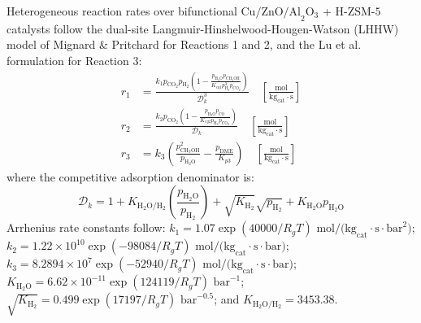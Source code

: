 \documentclass[12pt,a4paper]{article}
\begin{document}
Heterogeneous reaction rates over bifunctional $\text{Cu/ZnO/Al}_2\text{O}_3$ + $\text{H-ZSM-5}$ catalysts follow the dual-site Langmuir-Hinshelwood-Hougen-Watson (LHHW) model of Mignard \& Pritchard \cite{mignard2008} for Reactions 1 and 2, and the Lu et al. \cite{lu2004} formulation for Reaction 3:
\begin{align}
    r_1 &= \frac{k_1 p_{\text{CO}_2} p_{\text{H}_2} \left( 1 - \frac{p_{\text{H}_2\text{O}} p_{\text{CH}_3\text{OH}}}{K_{eq1} p_{\text{H}_2}^3 p_{\text{CO}_2}} \right)}{\mathcal{D}_k^3} \quad \left[\frac{\text{mol}}{\text{kg}_{\text{cat}}\cdot\text{s}}\right] \label{eq:r1} \\
    r_2 &= \frac{k_2 p_{\text{CO}_2} \left( 1 - \frac{p_{\text{H}_2\text{O}} p_{\text{CO}}}{K_{eq2} p_{\text{H}_2} p_{\text{CO}_2}} \right)}{\mathcal{D}_k} \quad \left[\frac{\text{mol}}{\text{kg}_{\text{cat}}\cdot\text{s}}\right] \label{eq:r2} \\
    r_3 &= k_3 \left( \frac{p_{\text{CH}_3\text{OH}}^2}{p_{\text{H}_2\text{O}}} - \frac{p_{\text{DME}}}{K_{p3}} \right) \quad \left[\frac{\text{mol}}{\text{kg}_{\text{cat}}\cdot\text{s}}\right] \label{eq:r3}
\end{align}
where the competitive adsorption denominator is:
\begin{equation}
    \mathcal{D}_k = 1 + K_{\text{H}_2\text{O}/\text{H}_2} \left( \frac{p_{\text{H}_2\text{O}}}{p_{\text{H}_2}} \right) + \sqrt{K_{\text{H}_2}} \sqrt{p_{\text{H}_2}} + K_{\text{H}_2\text{O}} p_{\text{H}_2\text{O}} \label{eq:dk}
\end{equation}
Arrhenius rate constants follow: $k_1 = 1.07 \exp(40000 / R_g T)\text{ mol/(kg}_{\text{cat}}\cdot\text{s}\cdot\text{bar}^2)$; $k_2 = 1.22 \times 10^{10} \exp(-98084 / R_g T)\text{ mol/(kg}_{\text{cat}}\cdot\text{s}\cdot\text{bar})$; $k_3 = 8.2894 \times 10^7 \exp(-52940 / R_g T)\text{ mol/(kg}_{\text{cat}}\cdot\text{s}\cdot\text{bar})$; $K_{\text{H}_2\text{O}} = 6.62 \times 10^{-11} \exp(124119 / R_g T)\text{ bar}^{-1}$; $\sqrt{K_{\text{H}_2}} = 0.499 \exp(17197 / R_g T)\text{ bar}^{-0.5}$; and $K_{\text{H}_2\text{O}/\text{H}_2} = 3453.38$.

\end{document}
